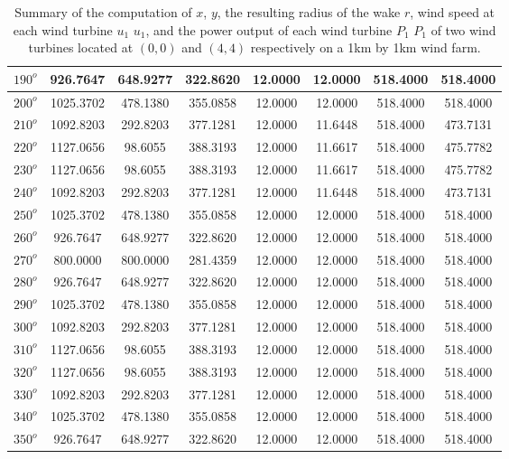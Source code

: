 \begin{table}[H]
\begin{tabular}{|c|c|c|c|c|c|c|c|}
$190^o$	&926.7647	&648.9277	&322.8620	&12.0000	&12.0000	&518.4000	&518.4000 \\ \hline
$200^o$	&1025.3702	&478.1380	&355.0858	&12.0000	&12.0000	&518.4000	&518.4000 \\ \hline
$210^o$	&1092.8203	&292.8203	&377.1281	&12.0000	&11.6448	&518.4000	&473.7131 \\ \hline
$220^o$	&1127.0656	&98.6055	&388.3193	&12.0000	&11.6617	&518.4000	&475.7782 \\ \hline
$230^o$	&1127.0656	&98.6055	&388.3193	&12.0000	&11.6617	&518.4000	&475.7782 \\ \hline
$240^o$	&1092.8203	&292.8203	&377.1281	&12.0000	&11.6448	&518.4000	&473.7131 \\ \hline
$250^o$	&1025.3702	&478.1380	&355.0858	&12.0000	&12.0000	&518.4000	&518.4000 \\ \hline
$260^o$	&926.7647	&648.9277	&322.8620	&12.0000	&12.0000	&518.4000	&518.4000 \\ \hline
$270^o$	&800.0000	&800.0000	&281.4359	&12.0000	&12.0000	&518.4000	&518.4000 \\ \hline
$280^o$	&926.7647	&648.9277	&322.8620	&12.0000	&12.0000	&518.4000	&518.4000 \\ \hline
$290^o$	&1025.3702	&478.1380	&355.0858	&12.0000	&12.0000	&518.4000	&518.4000 \\ \hline
$300^o$	&1092.8203	&292.8203	&377.1281	&12.0000	&12.0000	&518.4000	&518.4000 \\ \hline
$310^o$	&1127.0656	&98.6055	&388.3193	&12.0000	&12.0000	&518.4000	&518.4000 \\ \hline
$320^o$	&1127.0656	&98.6055	&388.3193	&12.0000	&12.0000	&518.4000	&518.4000 \\ \hline
$330^o$	&1092.8203	&292.8203	&377.1281	&12.0000	&12.0000	&518.4000	&518.4000 \\ \hline
$340^o$	&1025.3702	&478.1380	&355.0858	&12.0000	&12.0000	&518.4000	&518.4000 \\ \hline
$350^o$	&926.7647	&648.9277	&322.8620	&12.0000	&12.0000	&518.4000	&518.4000 \\ \hline
    \end{tabular}
    \caption{Summary of the computation of $x$, $y$, the resulting radius of the wake $r$, wind speed at each wind turbine $u_1$ $u_1$, and the power output of each wind turbine $P_1$ $P_1$ of two wind turbines located at $(0,0)$ and $(4,4)$ respectively on a 1km by 1km wind farm.}
    \label{summaryBest2}
\end{table}
\doublespacing

